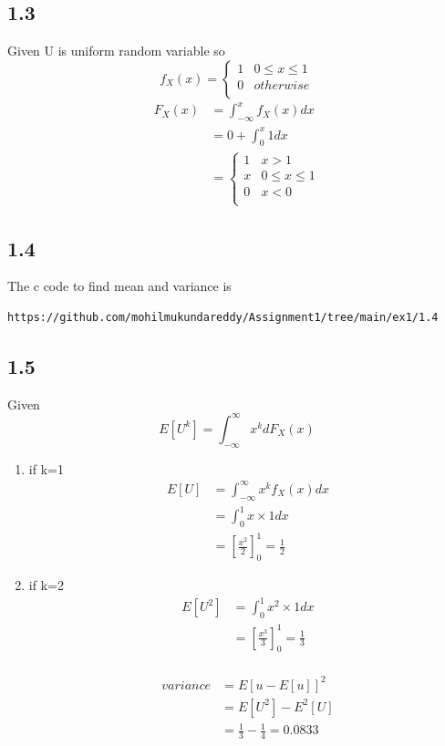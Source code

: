 \documentclass[journal,12pt,twocolumn]{IEEEtran}
\begin{document}
\subsection*{1.3}
Given U is uniform random variable so
\[
  f_X (x) =
 \begin{cases}
 1  & 0 \le x \le 1 \\
 0  & otherwise \\
 \end{cases}
\]
\begin{align*}
    F_X (x) &= \int_{-\infty} ^{x} f_X (x) dx \\
          &= 0 + \int_{0} ^{x} 1 dx \\
          &= 
\begin{cases}
 1 & x >1 \\
 x & 0 \le x \le 1 \\
 0  & x<0 \\
 \end{cases}
\end{align*}

\subsection*{1.4}
The c code to find mean and variance is
\begin{lstlisting}
https://github.com/mohilmukundareddy/Assignment1/tree/main/ex1/1.4
\end{lstlisting}
\subsection*{1.5}
Given
$$E[U^{k}] = \int_{-\infty} ^{\infty} x^{k}dF_X (x)$$
\begin{enumerate}
    \item if k=1 
     \begin{align*}
        E[U] &= \int_{-\infty} ^{\infty} x^{k}f_X (x) dx \\
           &= \int_{0} ^{1} x \times 1 dx \\
           &= \left[\frac{x^2}{2}\right]_{0} ^{1} = \frac{1}{2}
     \end{align*} 
     \item if k=2 
       \begin{align*}
          E[U^2] &= \int_{0} ^{1} x^{2}\times 1 dx \\
          &= \left[\frac{x^3}{3}\right]_{0} ^{1} = \frac{1}{3}
      \end{align*}\\
      \begin{align*}
    variance &= E[u-E[u]]^{2} \\
    &= E[U^{2}]-E^{2}[U] \\
    &= \frac{1}{3} - \frac{1}{4} = 0.0833 \\
\end{align*}
\end{enumerate}
\end{document}
